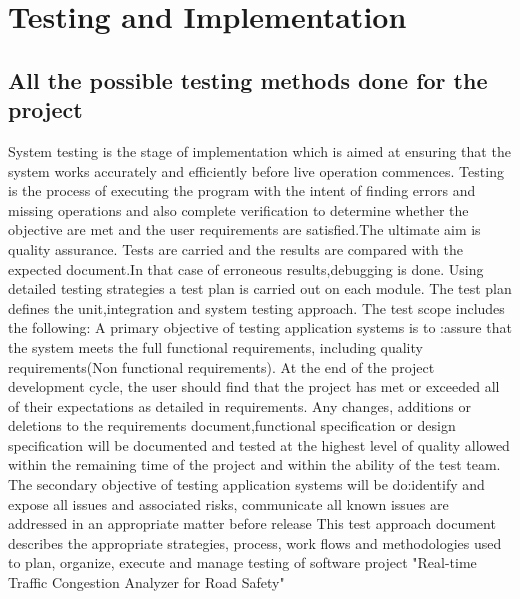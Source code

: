 \chapter{Testing and Implementation}
\section{All the possible testing methods done for the project}
\par System testing is the stage of implementation which is aimed at ensuring that the system works accurately and efficiently before live operation commences. Testing is the process of executing the program with the intent of finding errors and missing operations and also complete verification to determine whether the objective are met and the user requirements are satisfied.The ultimate aim is quality assurance.
Tests are carried and the results are compared with the expected document.In that case of erroneous results,debugging is done. Using detailed testing strategies a test plan is carried out on each module.
The test plan defines the unit,integration and system testing approach. The test scope includes the following:
A primary objective of testing application systems is to :assure that the system meets the full functional requirements, including quality requirements(Non functional requirements). At the end of the project development cycle, the user should find that the project has met or exceeded all of their expectations as detailed in requirements.
Any changes, additions or deletions to the requirements document,functional specification or design specification will be documented and tested at the highest level of quality allowed within the remaining time of the project and within the ability of the test team.
The secondary objective of testing application systems will be do:identify and expose all issues and associated risks, communicate all known issues are addressed in an appropriate matter before release
This test approach document describes the appropriate strategies, process, work flows and methodologies used to plan, organize, execute and manage testing of software project "Real-time Traffic Congestion Analyzer for Road Safety"
\newpage


